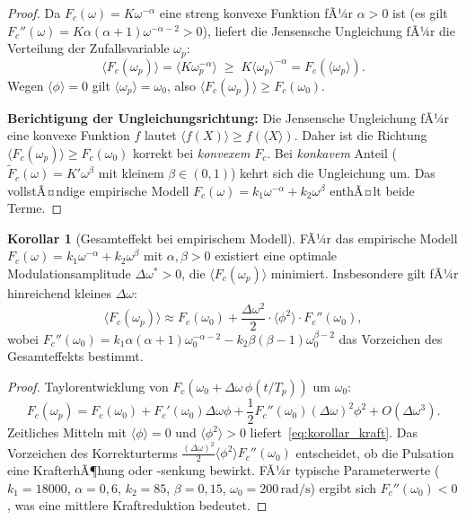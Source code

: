 ﻿\documentclass[a4paper,12pt]{article}
\theoremstyle{definition}
\newtheorem{korollar}{Korollar}
\begin{document}
\begin{proof}
Da $F_c(\omega) = K\omega^{-\alpha}$ eine streng konvexe Funktion fÃ¼r $\alpha > 0$ ist
(es gilt $F_c''(\omega) = K\alpha(\alpha+1)\omega^{-\alpha-2} > 0$), liefert die
Jensensche Ungleichung fÃ¼r die Verteilung der Zufallsvariable $\omega_p$:
\[
\langle F_c(\omega_p) \rangle = \langle K\omega_p^{-\alpha} \rangle \;\geq\; K \langle\omega_p\rangle^{-\alpha} = F_c(\langle\omega_p\rangle).
\]
Wegen $\langle\phi\rangle = 0$ gilt $\langle\omega_p\rangle = \omega_0$, also
$\langle F_c(\omega_p) \rangle \geq F_c(\omega_0)$.

\textbf{Berichtigung der Ungleichungsrichtung:} Die Jensensche Ungleichung fÃ¼r
eine konvexe Funktion $f$ lautet $\langle f(X) \rangle \geq f(\langle X \rangle)$.
Daher ist die Richtung $\langle F_c(\omega_p)\rangle \geq F_c(\omega_0)$ korrekt
bei \emph{konvexem} $F_c$. Bei \emph{konkavem} Anteil ($\tilde{F}_c(\omega) = K'\omega^{\beta}$
mit kleinem $\beta \in (0,1)$) kehrt sich die Ungleichung um. Das vollstÃ¤ndige
empirische Modell $F_c(\omega) = k_1\omega^{-\alpha} + k_2\omega^{\beta}$ enthÃ¤lt beide Terme.
\end{proof}

\begin{korollar}[Gesamteffekt bei empirischem Modell]
\label{kor:gesamt}
FÃ¼r das empirische Modell $F_c(\omega) = k_1\omega^{-\alpha} + k_2\omega^{\beta}$
mit $\alpha, \beta > 0$ existiert eine optimale Modulationsamplitude
$\Delta\omega^* > 0$, die $\langle F_c(\omega_p)\rangle$ minimiert. Insbesondere gilt
fÃ¼r hinreichend kleines $\Delta\omega$:
\begin{equation}
\label{eq:korollar_kraft}
\langle F_c(\omega_p)\rangle \approx F_c(\omega_0) + \frac{\Delta\omega^2}{2} \cdot \langle\phi^2\rangle \cdot F_c''(\omega_0),
\end{equation}
wobei $F_c''(\omega_0) = k_1\alpha(\alpha+1)\omega_0^{-\alpha-2} - k_2\beta(\beta-1)\omega_0^{\beta-2}$
das Vorzeichen des Gesamteffekts bestimmt.
\end{korollar}

\begin{proof}
Taylorentwicklung von $F_c(\omega_0 + \Delta\omega\,\phi(t/T_p))$ um $\omega_0$:
\[
F_c(\omega_p) = F_c(\omega_0) + F_c'(\omega_0)\Delta\omega\phi + \frac{1}{2}F_c''(\omega_0)(\Delta\omega)^2\phi^2 + O(\Delta\omega^3).
\]
Zeitliches Mitteln mit $\langle\phi\rangle = 0$ und $\langle\phi^2\rangle > 0$ liefert~\eqref{eq:korollar_kraft}.
Das Vorzeichen des Korrekturterms $\frac{(\Delta\omega)^2}{2}\langle\phi^2\rangle F_c''(\omega_0)$
entscheidet, ob die Pulsation eine KrafterhÃ¶hung oder -senkung bewirkt. FÃ¼r typische Parameterwerte
($k_1 = 18000$, $\alpha = 0{,}6$, $k_2 = 85$, $\beta = 0{,}15$, $\omega_0 = 200\,\mathrm{rad/s}$)
ergibt sich $F_c''(\omega_0) < 0$, was eine mittlere Kraftreduktion bedeutet.
\end{proof}
\end{document}
